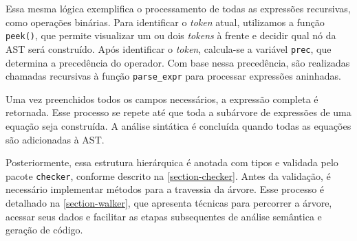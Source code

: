 Essa mesma lógica exemplifica o processamento de todas as expressões recursivas, como operações binárias. Para identificar o \textit{token} atual, utilizamos a função \texttt{peek()}, que permite visualizar um ou dois \textit{tokens} à frente e decidir qual nó da AST será construído. Após identificar o \textit{token}, calcula-se a variável \texttt{prec}, que determina a precedência do operador. Com base nessa precedência, são realizadas chamadas recursivas à função \texttt{parse\_expr} para processar expressões aninhadas.

Uma vez preenchidos todos os campos necessários, a expressão completa é retornada. Esse processo se repete até que toda a subárvore de expressões de uma equação seja construída. A análise sintática é concluída quando todas as equações são adicionadas à AST.

Posteriormente, essa estrutura hierárquica é anotada com tipos e validada pelo pacote \texttt{checker}, conforme descrito na \autoref{section-checker}. Antes da validação, é necessário implementar métodos para a travessia da árvore. Esse processo é detalhado na \autoref{section-walker}, que apresenta técnicas para percorrer a árvore, acessar seus dados e facilitar as etapas subsequentes de análise semântica e geração de código.

